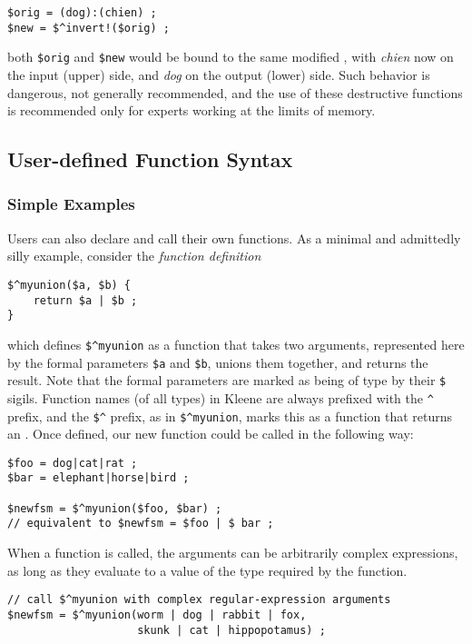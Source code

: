 \begin{Verbatim}
$orig = (dog):(chien) ;
$new = $^invert!($orig) ;
\end{Verbatim}

\noindent
both \verb!$orig! and \verb!$new! would be bound to the same
modified \fsm{}, with \emph{chien} now on the input (upper) side, and \emph{dog} on
the output (lower) side.  Such behavior is dangerous, not generally recommended, and the use of these
destructive functions is recommended only for experts working at the limits
of memory.

\subsection{User-defined Function Syntax}

\subsubsection{Simple Examples}

Users can also declare and call their own functions.  As a minimal and admittedly silly example, consider the
\emph{function definition}

\begin{Verbatim}
$^myunion($a, $b) {
    return $a | $b ;
}
\end{Verbatim}

\noindent
which defines \verb!$^myunion! as a function that takes two \fsm{} arguments, represented here by the formal
parameters \verb!$a! and \verb!$b!, unions them together, and returns the \fsm{} result.  Note that the formal
parameters are marked as being of type \fsm{} by their \verb!$! sigils.  Function names (of all types) 
in Kleene are always
prefixed with the \verb!^! prefix, and the \verb!$^! prefix, as in \verb!$^myunion!, marks this as a function
that
returns an \fsm{}.  Once defined, our new function could be called in the following way:

\begin{Verbatim}
$foo = dog|cat|rat ;
$bar = elephant|horse|bird ;

$newfsm = $^myunion($foo, $bar) ;
// equivalent to $newfsm = $foo | $ bar ;
\end{Verbatim}

\noindent
When a function is called, the arguments can be arbitrarily complex expressions, as long as they evaluate to a
value of the type required by the function.

\begin{Verbatim}
// call $^myunion with complex regular-expression arguments
$newfsm = $^myunion(worm | dog | rabbit | fox, 
                    skunk | cat | hippopotamus) ;
\end{Verbatim}

